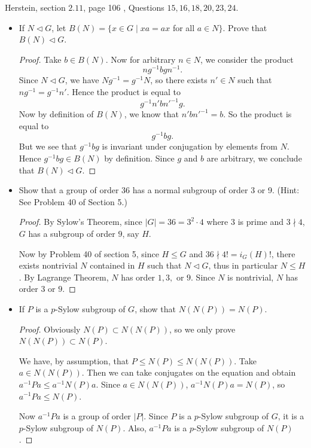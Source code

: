 Herstein, section $2.11$, page 106 , Questions $15,16,18,20,23,24$.
\begin{itemize}
	\item [15.] If $N \triangleleft G$, let $B(N)=\{x \in G \mid x a=a x$ for all $a \in N\}$. Prove that $B(N) \triangleleft G$.
\begin{proof}
	Take $b \in B(N)$. 
	Now for arbitrary $n \in N$, we consider the product
	\[
		n g^{-1} b g n^{-1}
	.\] 
	Since $N \triangleleft G$, we have $N g^{-1} = g^{-1} N$, so there exists $n' \in N$ such that $n g^{-1}  = g^{-1} n'$. Hence the product is equal to
	\[
		g^{-1} n' b n'^{-1} g
	.\] 
	Now by definition of $B(N)$, we know that $n' b n'^{-1} = b$. So the product is equal to
	\[
		g^{-1} b g
	.\] 
	But we see that $g^{-1} b g$ is invariant under conjugation by elements from $N$. Hence $g^{-1} b g \in B(N)$ by definition. Since $g$ and $b$ are arbitrary, we conclude that $B(N) \triangleleft G$.
\end{proof}

	\item [16.] Show that a group of order 36 has a normal subgroup of order 3 or 9.
(Hint: See Problem 40 of Section 5.)
\begin{proof}
	By Sylow's Theorem, since $|G| = 36 = 3^2 \cdot 4$ where $3$ is prime and $3 \nmid 4$, $G$ has a subgroup of order $9$, say $H$.

	Now by Problem 40 of section 5, since $H \le G$ and $36 \nmid 4! = i_G(H)!$, there exists nontrivial  $N$ contained in $H$ such that $N \triangleleft G$, thus in particular $N \le  H$. By Lagrange Theorem, $N$ has order $1, 3, $ or $9$. Since $N$ is nontrivial, $N$ has order $3$ or $9$.
\end{proof}

	\item [18.] If $P$ is a $p$-Sylow subgroup of $G$, show that $N(N(P))=N(P)$.
\begin{proof}
	Obviously $N(P) \subset N(N(P))$, so we only prove $N(N(P)) \subset N(P)$.

	We have, by assumption, that $P \le N(P) \le N(N(P))$. Take $a \in N(N(P))$. Then we can take conjugates on the equation and obtain $a^{-1} Pa \le a^{-1} N(P) a$. Since $a \in N(N(P))$, $a^{-1} N(P) a = N(P)$, so $a^{-1} P a \le N(P)$.
	
	Now  $a^{-1} P a$ is a group of order $|P|$. Since $P$ is a $p$-Sylow subgroup of $G$, it is a $p$-Sylow subgroup of $N(P)$. Also, $a^{-1} Pa$ is a $p$-Sylow subgroup of $N(P)$.


\end{proof}
\end{itemize}
